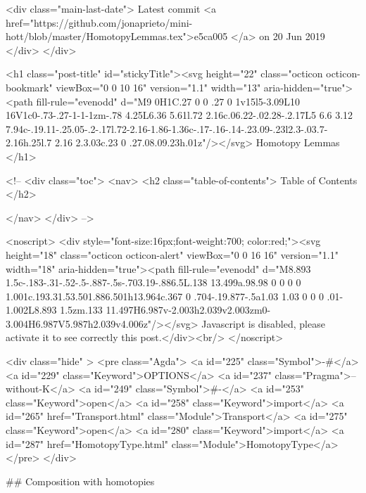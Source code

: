     <div class="main-last-date">
      Latest commit <a href="https://github.com/jonaprieto/mini-hott/blob/master/HomotopyLemmas.tex">e5ca005 </a> on  20 Jun 2019
    </div>
  </div>
  
  <h1 class="post-title" id="stickyTitle"><svg height="22" class="octicon octicon-bookmark" viewBox="0 0 10 16" version="1.1" width="13" aria-hidden="true"><path fill-rule="evenodd" d="M9 0H1C.27 0 0 .27 0 1v15l5-3.09L10 16V1c0-.73-.27-1-1-1zm-.78 4.25L6.36 5.61l.72 2.16c.06.22-.02.28-.2.17L5 6.6 3.12 7.94c-.19.11-.25.05-.2-.17l.72-2.16-1.86-1.36c-.17-.16-.14-.23.09-.23l2.3-.03.7-2.16h.25l.7 2.16 2.3.03c.23 0 .27.08.09.23h.01z"/></svg> Homotopy Lemmas
  </h1>

  <!-- 
  <div class="toc">
    <nav>
    <h2 class="table-of-contents"> Table of Contents </h2>
      

    </nav>
  </div>
   -->

  <noscript>
  <div style="font-size:16px;font-weight:700; color:red;"><svg height="18" class="octicon octicon-alert" viewBox="0 0 16 16" version="1.1" width="18" aria-hidden="true"><path fill-rule="evenodd" d="M8.893 1.5c-.183-.31-.52-.5-.887-.5s-.703.19-.886.5L.138 13.499a.98.98 0 0 0 0 1.001c.193.31.53.501.886.501h13.964c.367 0 .704-.19.877-.5a1.03 1.03 0 0 0 .01-1.002L8.893 1.5zm.133 11.497H6.987v-2.003h2.039v2.003zm0-3.004H6.987V5.987h2.039v4.006z"/></svg> Javascript is disabled, please activate it to see correctly this post.</div><br/>
  </noscript>

  <div class="hide" >
<pre class="Agda">
<a id="225" class="Symbol">{-#</a> <a id="229" class="Keyword">OPTIONS</a> <a id="237" class="Pragma">--without-K</a> <a id="249" class="Symbol">#-}</a>
<a id="253" class="Keyword">open</a> <a id="258" class="Keyword">import</a> <a id="265" href="Transport.html" class="Module">Transport</a>
<a id="275" class="Keyword">open</a> <a id="280" class="Keyword">import</a> <a id="287" href="HomotopyType.html" class="Module">HomotopyType</a>
</pre>
</div>

## Composition with homotopies

